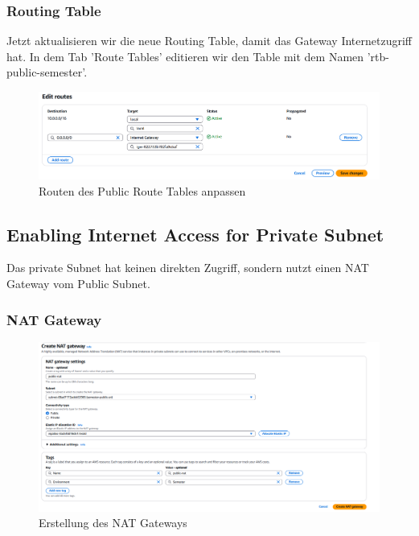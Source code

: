 \documentclass[a4paper,12pt]{article}
\begin{document}
\subsubsection{Routing Table}
Jetzt aktualisieren wir die neue Routing Table, damit das Gateway Internetzugriff hat.
In dem Tab 'Route Tables' editieren wir den Table mit dem Namen 'rtb-public-semester'.

\begin{figure}[h!]
	\centering
	\includegraphics[width=\textwidth]{data/Edit_Routes_Public.png}
	\caption{Routen des Public Route Tables anpassen}
	\label{fig:Attach Routen des Public Route Tables anpassen}
\end{figure}

\subsection{Enabling Internet Access for Private Subnet}
Das private Subnet hat keinen direkten Zugriff, sondern nutzt einen NAT Gateway vom Public Subnet.

\subsubsection{NAT Gateway}
\begin{figure}[h!]
	\centering
	\includegraphics[width=\textwidth]{data/Create_NAT.png}
	\caption{Erstellung des NAT Gateways}
	\label{fig:Erstellung des NAT Gateways}
\end{figure}
\end{document}
